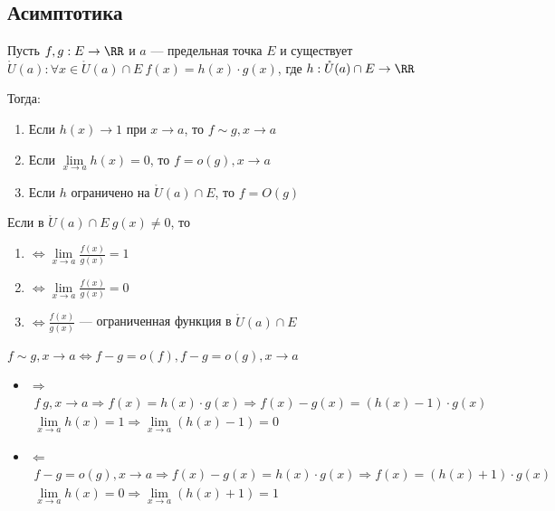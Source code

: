 \subsection{Асимптотика}

\begin{defn}{}{}
    Пусть \( f, g : E \to \RR \) и \( a \) --- предельная точка \( E \) и существует 
    \( \mathring{U}(a) : \forall x \in \mathring{U}(a) \cap E \ f(x) = h(x) \cdot g(x) \),
    где \( h : \mathring{U}(a) \cap E \to  \RR \)

    Тогда:
    \begin{enumerate}
        \item
            Если \( h(x) \to 1 \) при \( x \to a \), то \( f \sim g, x \to a \)
        \item
            Если \( \lim\limits_{x \to a} h(x) = 0 \), то \( f = o(g), x \to a \)
        \item
            Если \( h \) ограничено на \( \mathring{U}(a) \cap E \), то \( f = O(g) \)
    \end{enumerate}

    Если в \( \mathring{U}(a) \cap E \ g(x) \neq 0 \), то
    \begin{enumerate}
        \item
            \( \Leftrightarrow \lim\limits_{x \to a} \frac{f(x)}{g(x)} = 1 \)
        \item
            \( \Leftrightarrow \lim\limits_{x \to a} \frac{f(x)}{g(x)} = 0 \)
        \item
            \( \Leftrightarrow \frac{f(x)}{g(x)} \) --- ограниченная функция в \( \mathring{U}(a) \cap E \)
    \end{enumerate}
\end{defn}

\newpage

\begin{example}{}{}
    \( f \sim g, x \to a \Leftrightarrow f - g = o(f), f - g = o(g), x \to a \)
\end{example}

\begin{itemize}
    \item
        \( \Rightarrow \)
        \begin{gather*}
            f ~ g, x \to a \Rightarrow f(x) = h(x) \cdot g(x) \Rightarrow f(x) - g(x) = (h(x) - 1) \cdot g(x)
            \\
            \lim\limits_{x \to a} h(x) = 1 \Rightarrow \lim\limits_{x \to a} (h(x) - 1) = 0
        \end{gather*}
    \item
        \( \Leftarrow \)
        \begin{gather*} 
            f - g = o(g), x \to a \Rightarrow f(x) - g(x) = h(x) \cdot g(x) \Rightarrow f(x) = (h(x) + 1) \cdot g(x)
            \\
            \lim\limits_{x \to a} h(x) = 0 \Rightarrow \lim\limits_{x \to a} (h(x) + 1) = 1
        \end{gather*}
\end{itemize}


